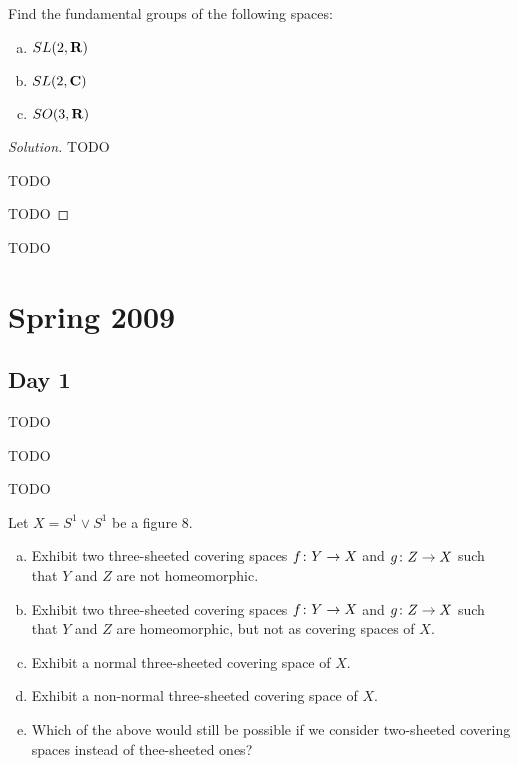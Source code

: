 
Find the fundamental groups of the following spaces:
\begin{enumerate}[(a)]
\item $SL(2,\mathbf{R})$
\item $SL(2,\mathbf{C})$
\item $SO(3,\mathbf{R})$
\end{enumerate}

\begin{proof}[Solution]
  TODO
  
  TODO
  
  TODO
\end{proof}


TODO

\section{Spring 2009}
\label{S:spring-2009}

\subsection{Day 1}
\label{S:spring-2009-1}
\mbox{}


TODO


TODO


TODO


Let $X = S^1 \vee S^1$ be a figure $8$.
\begin{enumerate}[(a)]
\item Exhibit two three-sheeted covering spaces $f \colon Y \rightarrow X$ and $g \colon Z \rightarrow X$ such that $Y$ and $Z$ are not homeomorphic.
\item Exhibit two three-sheeted covering spaces $f \colon Y \rightarrow X$ and $g \colon Z \rightarrow X$ such that $Y$ and $Z$ are homeomorphic, but not as covering spaces of $X$.
\item Exhibit a normal three-sheeted covering space of $X$.
\item Exhibit a non-normal three-sheeted covering space of $X$.
\item Which of the above would still be possible if we consider two-sheeted covering spaces instead of thee-sheeted ones?
\end{enumerate}

